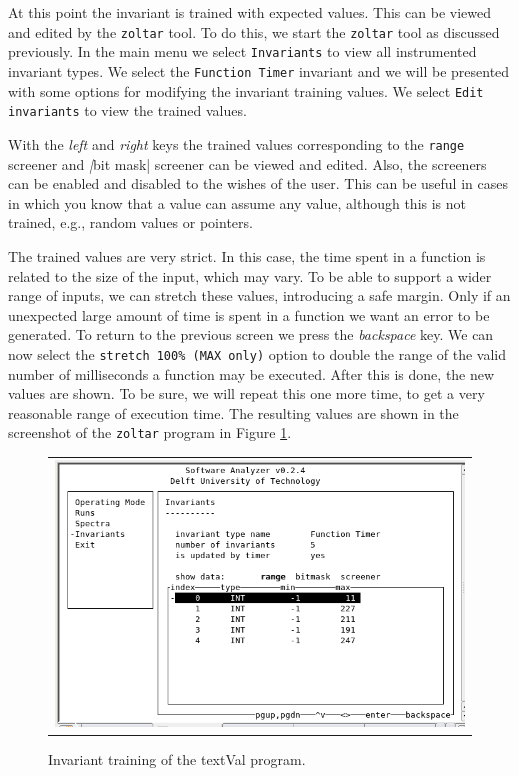 	At this point the invariant is trained with expected values.
	This can be viewed and edited by the \verb|zoltar| tool.
	To do this, we start the \verb|zoltar| tool as discussed previously.
	In the main menu we select \verb|Invariants| to view all instrumented invariant types.
	We select the \verb|Function Timer| invariant and we will be presented with some options
	for modifying the invariant training values.
	We select \verb|Edit invariants| to view the trained values.
	
	With the \emph{left} and \emph{right} keys the trained values corresponding to the 
	\verb|range| screener and \emph|bit mask| screener can be viewed and edited.
	Also, the screeners can be enabled and disabled to the wishes of the user.
	This can be useful in cases in which you know that a value can assume any value,
	although this is not trained, e.g., random values or pointers.
	
	The trained values are very strict.
	In this case, the time spent in a function is related to the size of the input,
	which may vary.
	To be able to support a wider range of inputs, 
	we can stretch these values, introducing a safe margin.
	Only if an unexpected large amount of time is spent in a function we want an error to be generated.
	To return to the previous screen we press the \emph{backspace} key.
	We can now select the \verb|stretch 100% (MAX only)| option to double the range of the 
	valid number of milliseconds a function may be executed.
	After this is done, the new values are shown.
	To be sure, we will repeat this one more time, to get a very reasonable range of execution time.
	The resulting values are shown in the screenshot of the \verb|zoltar| program in 
	Figure \ref{fig:analyzeInv}.
	
	\begin{figure}[h!]
		\begin{center}
		\begin{tabular}{c}
			\includegraphics[scale=0.40]{sources/analyze_inv.png} \\
		\end{tabular}
		\end{center}
		\caption{Invariant training of the textVal program.}
		\label{fig:analyzeInv}
	\end{figure}


